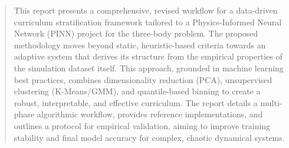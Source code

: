 \begin{abstract}
This report presents a comprehensive, revised workflow for a data-driven curriculum stratification framework tailored to a Physics-Informed Neural Network (PINN) project for the three-body problem. The proposed methodology moves beyond static, heuristic-based criteria towards an adaptive system that derives its structure from the empirical properties of the simulation dataset itself. This approach, grounded in machine learning best practices, combines dimensionality reduction (PCA), unsupervised clustering (K-Means/GMM), and quantile-based binning to create a robust, interpretable, and effective curriculum. The report details a multi-phase algorithmic workflow, provides reference implementations, and outlines a protocol for empirical validation, aiming to improve training stability and final model accuracy for complex, chaotic dynamical systems.
\end{abstract}

